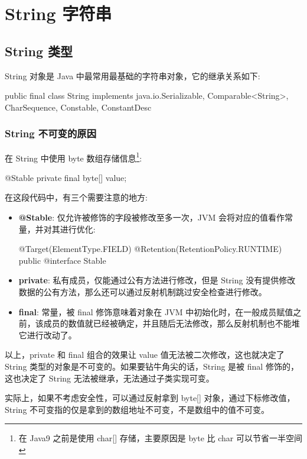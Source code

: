 \section{String 字符串}

\subsection{String 类型}

String 对象是 Java 中最常用最基础的字符串对象，它的继承关系如下:

\begin{Java}
public final class String
    implements java.io.Serializable, Comparable<String>, CharSequence, Constable, ConstantDesc 
\end{Java}

\subsubsection{String 不可变的原因}

在 String 中使用 byte 数组存储信息\footnote{在 Java9 之前是使用 char[] 存储，主要原因是 byte 比 char 可以节省一半空间}:

\begin{Java}
@Stable
private final byte[] value;
\end{Java}

在这段代码中，有三个需要注意的地方:
\begin{itemize}
    \item \textbf{@Stable}: 仅允许被修饰的字段被修改至多一次，JVM 会将对应的值看作常量，并对其进行优化:
\begin{Java}
@Target(ElementType.FIELD)
@Retention(RetentionPolicy.RUNTIME)
public @interface Stable { }
\end{Java}
    \item \textbf{private}: 私有成员，仅能通过公有方法进行修改，但是 String 没有提供修改数据的公有方法，那么还可以通过反射机制跳过安全检查进行修改。
    \item \textbf{final}: 常量，被 final 修饰意味着对象在 JVM 中初始化时，在一般成员赋值之前，该成员的数值就已经被确定，并且随后无法修改，那么反射机制也不能堆它进行改动了。
\end{itemize}

以上，private 和 final 组合的效果让 value 值无法被二次修改，这也就决定了 String 类型的对象是不可变的。如果要钻牛角尖的话，String 是被 final 修饰的，这也决定了 String 无法被继承，无法通过子类实现可变。

实际上，如果不考虑安全性，可以通过反射拿到 byte[] 对象，通过下标修改值，String 不可变指的仅是拿到的数组地址不可变，不是数组中的值不可变。

